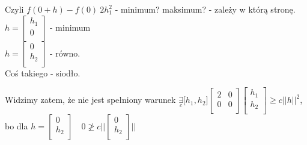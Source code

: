 \documentclass[../main.tex]{subfiles}
\begin{document}
Czyli $f(0+h) - f(0) ~ 2h_1^2$ - minimum? maksimum? - zależy w którą stronę.\\
$h = \left [ \begin{matrix}
h_1\\
0\\
\end{matrix}\right ] $ - minimum\\
$h = \left [ \begin{matrix}
0\\
h_2\\
\end{matrix}\right ] $ - równo.\\
Coś takiego - siodło.

Widzimy zatem, że nie jest spełniony warunek $\underset{c}{\exists}\big [ h_1, h_2 \big ] \left [ \begin{matrix}
2 &0\\
0 &0\\
\end{matrix}\right ]
\left [ \begin{matrix}
h_1\\
h_2\\
    \end{matrix}\right ] \geq c \big | \big | h \big | \big | ^2$, bo dla $h = \left [ \begin{matrix}
0\\
h_2\\
    \end{matrix}\right ] \quad 0 \not\geq c \Bigg | \Bigg | \left [ \begin{matrix}
0\\
h_2\\
\end{matrix}\right ] \Bigg |\Bigg |$
\end{document}
